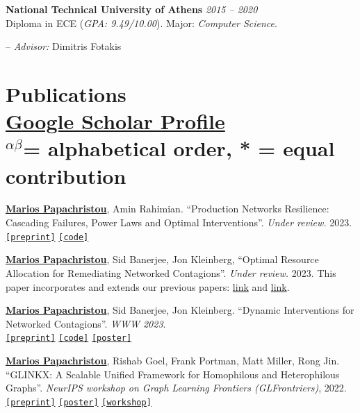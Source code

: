 \documentclass[margin]{res}
\newcommand{\field}[2]{\noindent \textbf{#1} \hfill #2 \\}
\newcommand{\alphabeticalorder}[0]{\ensuremath {^{\alpha \beta}}}
\newcommand{\specialurl}[2]{\href {#2} {\texttt{[#1]}}}
\newcommand{\preprint}[1]{\specialurl {preprint} {#1}}
\newcommand{\code}[1]{\specialurl {code} {#1}}
\newcommand{\poster}[1]{\specialurl {poster} {#1}}
\newcommand{\workshop}[1]{\specialurl {workshop} {#1}}
\newcommand{\authorref}[1]{\underline {\textbf{#1}}}
\newcommand{\authorme}{\authorref{Marios Papachristou}}
\begin{document}
\begin{resume}
\field{National Technical University of Athens}  {\emph{2015 -- 2020}} 
Diploma in ECE (\emph{GPA: 9.49/10.00}). Major: \emph{Computer Science}.
\begin{compactitem}
\item[--] \emph{Advisor:} Dimitris Fotakis

\end{compactitem} 

\section{Publications\\ {
\footnotesize
\textup{\href{https://scholar.google.gr/citations?user=T12JO3MAAAAJ&hl=en}{Google Scholar Profile}} \\\alphabeticalorder  = \textup{alphabetical order}, * = \textup{equal contribution}
}}


\begin{compactenum}
   \item \authorme, Amin Rahimian. ``Production Networks Resilience: Cascading Failures, Power Laws and Optimal Interventions''. \emph{Under review.} 2023. \\ \preprint{https://papers.ssrn.com/sol3/papers.cfm?abstract_id=4392226} \code{https://github.com/papachristoumarios/supply-chain-resilience} 
   \item \authorme, Sid Banerjee, Jon Kleinberg, ``Optimal Resource Allocation for Remediating Networked Contagions''. \emph{Under review.} 2023. This paper incorporates and extends our previous papers: \href{https://doi.org/10.1145/3485447.3512047}{link} and \href{https://arxiv.org/abs/2205.13394}{link}.  
 
   \item \authorme, Sid Banerjee, Jon Kleinberg. ``Dynamic Interventions for Networked Contagions''. \emph{WWW 2023}. \\
		\preprint{https://arxiv.org/abs/2205.13394} \code{https://github.com/papachristoumarios/dynamic-clearing} \poster{https://drive.google.com/file/d/1l0TCsoZNo3NoOOHsPSh1ofctXD4ivFir/view?usp=sharing}

   \item \authorme, Rishab Goel, Frank Portman, Matt Miller, Rong Jin. ``GLINKX: A Scalable Unified Framework for Homophilous and Heterophilous Graphs''. \emph{NeurIPS workshop on Graph Learning Frontiers (GLFrontriers)}, 2022. \\ \preprint{https://arxiv.org/abs/2211.00550} \poster{https://drive.google.com/file/d/14LwkvoH7sUe6qGvINGqTuMSHid16J3Av/view?usp=share_link} \workshop{https://openreview.net/forum?id=GlViaJSwnlK}


\end{compactenum}
\end{resume}
\end{document}
